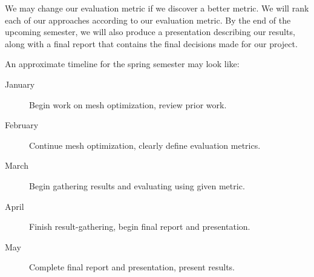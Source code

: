 \documentclass{article}
\begin{document}
We may change our evaluation metric if we discover a better metric. We will rank each of our approaches according to our evaluation metric. By the end of the upcoming semester, we will also produce a presentation describing our results, along with a final report that contains the final decisions made for our project.

An approximate timeline for the spring semester may look like:
\begin{description}
\item[January] Begin work on mesh optimization, review prior work.
\item[February] Continue mesh optimization, clearly define evaluation metrics.
\item[March] Begin gathering results and evaluating using given metric.
\item[April] Finish result-gathering, begin final report and presentation.
\item[May] Complete final report and presentation, present results.
\end{description}

\clearpage
\printbibliography[
    heading=bibnumbered,
    title={References}
]
\end{document}
